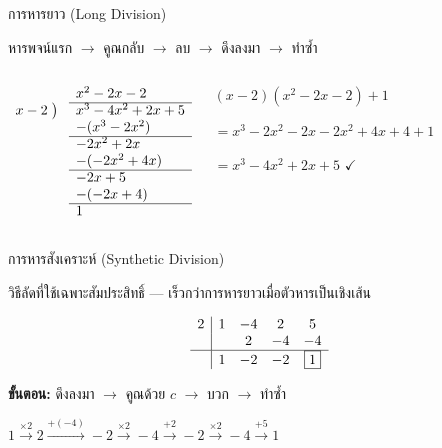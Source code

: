 \documentclass[11pt, aspectratio=169]{beamer}
\begin{document}
\begin{frame}{การหารยาว (Long Division)}
  \begin{explanation}
    หารพจน์แรก $\rightarrow$ คูณกลับ $\rightarrow$ ลบ $\rightarrow$ ดึงลงมา $\rightarrow$ ทำซํ้า
  \end{explanation}
  \begin{columns}[T]
        \begin{exambox}
        \[
        \begin{array}{rl}
          & x^2 - 2x - 2 \\
          \cline{2-2}
          x - 2 \;\big)\; & x^3 - 4x^2 + 2x + 5 \\
          & -(x^3 - 2x^2) \\
          \cline{2-2}
          & -2x^2 + 2x \\
          & -(-2x^2 + 4x) \\
          \cline{2-2}
          & -2x + 5 \\
          & -(-2x + 4) \\
          \cline{2-2}
          & 1
        \end{array}
        \]
      \end{exambox}

    \begin{intuition}[ตรวจคำตอบ]

        $(x-2)(x^2-2x-2) + 1$

        $= x^3 - 2x^2 - 2x - 2x^2 + 4x + 4 + 1$

        $= x^3 - 4x^2 + 2x + 5$ \quad $\checkmark$
      \end{intuition}
  \end{columns}
\end{frame}\begin{frame}{การหารสังเคราะห์ (Synthetic Division)}
  \begin{explanation}
    วิธีลัดที่ใช้เฉพาะสัมประสิทธิ์ — เร็วกว่าการหารยาวเมื่อตัวหารเป็นเชิงเส้น
  \end{explanation}

  \begin{exambox}
    \[
    \begin{array}{c|cccc}
      2 & 1 & -4 & 2 & 5 \\
        &   & 2  & -4 & -4 \\
      \hline
        & 1 & -2 & -2 & \boxed{1}
    \end{array}
    \]

    \textbf{ขั้นตอน:} ดึงลงมา $\rightarrow$ คูณด้วย $c$ $\rightarrow$ บวก $\rightarrow$ ทำซํ้า

    \begin{center}
    {\small $1 \xrightarrow{\times 2} 2 \xrightarrow{+(-4)} -2 \xrightarrow{\times 2} -4 \xrightarrow{+2} -2 \xrightarrow{\times 2} -4 \xrightarrow{+5} 1$}
    \end{center}

  \end{exambox}
\end{frame}
\end{document}

